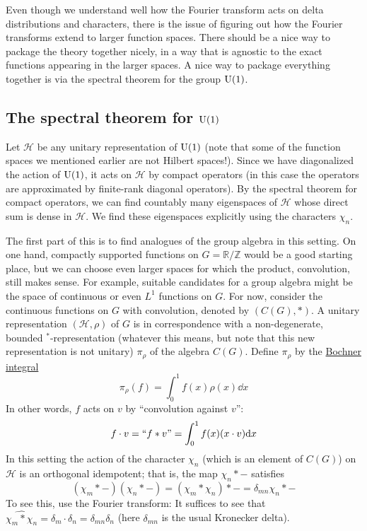 \documentclass[../../rtnotes.tex]{subfiles}
\begin{document}
Even though we understand well how the Fourier transform acts on delta distributions and characters, there is the issue of figuring out how the Fourier transforms extend to larger function spaces. There should be a nice way to package the theory together nicely, in a way that is agnostic to the exact functions appearing in the larger spaces. A nice way to package everything together is via the spectral theorem for the group $\operatorname{U}(1)$.

\subsection{The spectral theorem for $\operatorname{U}(1)$}
Let $\mathcal H$ be any unitary representation of $\operatorname{U}(1)$ (note that some of the function spaces we mentioned earlier are not Hilbert spaces!). Since we have diagonalized the action of $\operatorname{U}(1)$, it acts on $\mathcal H$ by compact operators (in this case the operators are approximated by finite-rank diagonal operators). By the spectral theorem for compact operators, we can find countably many eigenspaces of $\mathcal H$ whose direct sum is dense in $\mathcal H$. We find these eigenspaces explicitly using the characters $\chi_n$.

The first part of this is to find analogues of the group algebra in this setting. On one hand, compactly supported functions on $G = \mathbb R/\mathbb Z$ would be a good starting place, but we can choose even larger spaces for which the product, convolution, still makes sense. For example, suitable candidates for a group algebra might be the space of continuous or even $L^1$ functions on $G$. For now, consider the continuous functions on $G$ with convolution, denoted by $(C(G),\ast)$. A unitary representation $(\mathcal H,\rho)$ of $G$ is in correspondence with a non-degenerate, bounded ${}^\ast$-representation (whatever this means, but note that this new representation is not unitary) $\pi_\rho$ of the algebra $C(G)$. Define $\pi_\rho$ by the \href{https://en.wikipedia.org/wiki/Bochner_integral}{Bochner integral}
\[\pi_\rho(f) = \int_0^1 f(x)\rho(x)\dd x\]
In other words, $f$ acts on $v$ by ``convolution against $v$'':
\[f\cdot v = ``f\ast v\textrm{''} = \int_0^1 f(x)(x\cdot v)\dd x\]
In this setting the action of the character $\chi_n$ (which is an element of $C(G)$) on $\mathcal H$ is an orthogonal idempotent; that is, the map $\chi_n\ast -$ satisfies 
\[(\chi_m\ast -)(\chi_n\ast -) = (\chi_m\ast\chi_n)\ast - = \delta_{mn}\chi_n\ast -\]
To see this, use the Fourier transform: It suffices to see that $\widehat{\chi_m\ast\chi_n} = \delta_m\cdot \delta_n = \delta_{mn}\delta_n$ (here $\delta_{mn}$ is the usual Kronecker delta).
\end{document}
